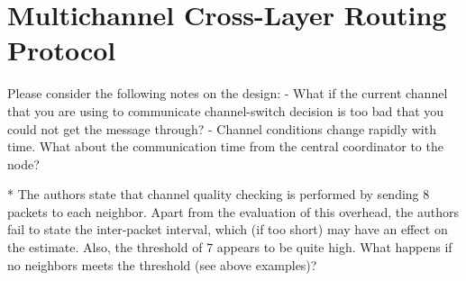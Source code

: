 \section{Multichannel Cross-Layer Routing Protocol}
\label{sec:multichannel}

Please consider the following notes on the design:
- What if the current channel that you are using to communicate channel-switch decision is  too bad that you could not get the message through?
- Channel conditions change rapidly with time. What about the communication time from the central coordinator to the node?

* The authors state that channel quality checking is performed by sending 8
  packets to each neighbor. Apart from the evaluation of this overhead, the
  authors fail to state the inter-packet interval, which (if too short) may
  have an effect on the estimate. Also, the threshold of 7 appears to be quite
  high. What happens if no neighbors meets the threshold (see above examples)?
  
  